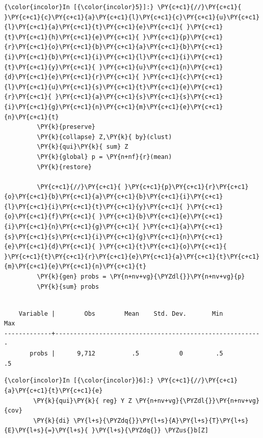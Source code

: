 \documentclass[11pt,notitlepage]{article}\usepackage[]{graphicx}\usepackage[]{color}
\makeatletter
\newenvironment{kframe}{%
 \def\at@end@of@kframe{}%
 \ifinner\ifhmode%
  \def\at@end@of@kframe{\end{minipage}}%
  \begin{minipage}{\columnwidth}%
 \fi\fi%
 \def\FrameCommand##1{\hskip\@totalleftmargin \hskip-\fboxsep
 \colorbox{shadecolor}{##1}\hskip-\fboxsep
     \hskip-\linewidth \hskip-\@totalleftmargin \hskip\columnwidth}%
 \MakeFramed {\advance\hsize-\width
   \@totalleftmargin\z@ \linewidth\hsize
   \@setminipage}}%
 {\par\unskip\endMakeFramed%
 \at@end@of@kframe}
\newenvironment{knitrout}{}{} %
\makeatother
\begin{document}
\begin{enumerate}[a)]
\begin{knitrout}
\color{fgcolor}\begin{kframe}
   \begin{Verbatim}[commandchars=\\\{\}]
{\color{incolor}In [{\color{incolor}5}]:} \PY{c+c1}{//}\PY{c+c1}{ }\PY{c+c1}{c}\PY{c+c1}{a}\PY{c+c1}{l}\PY{c+c1}{c}\PY{c+c1}{u}\PY{c+c1}{l}\PY{c+c1}{a}\PY{c+c1}{t}\PY{c+c1}{e}\PY{c+c1}{ }\PY{c+c1}{t}\PY{c+c1}{h}\PY{c+c1}{e}\PY{c+c1}{ }\PY{c+c1}{p}\PY{c+c1}{r}\PY{c+c1}{o}\PY{c+c1}{b}\PY{c+c1}{a}\PY{c+c1}{b}\PY{c+c1}{i}\PY{c+c1}{b}\PY{c+c1}{i}\PY{c+c1}{l}\PY{c+c1}{i}\PY{c+c1}{t}\PY{c+c1}{y}\PY{c+c1}{ }\PY{c+c1}{u}\PY{c+c1}{n}\PY{c+c1}{d}\PY{c+c1}{e}\PY{c+c1}{r}\PY{c+c1}{ }\PY{c+c1}{c}\PY{c+c1}{l}\PY{c+c1}{u}\PY{c+c1}{s}\PY{c+c1}{t}\PY{c+c1}{e}\PY{c+c1}{r}\PY{c+c1}{ }\PY{c+c1}{a}\PY{c+c1}{s}\PY{c+c1}{s}\PY{c+c1}{i}\PY{c+c1}{g}\PY{c+c1}{n}\PY{c+c1}{m}\PY{c+c1}{e}\PY{c+c1}{n}\PY{c+c1}{t}
         \PY{k}{preserve}
         \PY{k}{collapse} Z,\PY{k}{ by}(clust)   
         \PY{k}{qui}\PY{k}{ sum} Z
         \PY{k}{global} p = \PY{n+nf}{r}(mean)
         \PY{k}{restore}
         
         \PY{c+c1}{//}\PY{c+c1}{ }\PY{c+c1}{p}\PY{c+c1}{r}\PY{c+c1}{o}\PY{c+c1}{b}\PY{c+c1}{a}\PY{c+c1}{b}\PY{c+c1}{i}\PY{c+c1}{l}\PY{c+c1}{i}\PY{c+c1}{t}\PY{c+c1}{y}\PY{c+c1}{ }\PY{c+c1}{o}\PY{c+c1}{f}\PY{c+c1}{ }\PY{c+c1}{b}\PY{c+c1}{e}\PY{c+c1}{i}\PY{c+c1}{n}\PY{c+c1}{g}\PY{c+c1}{ }\PY{c+c1}{a}\PY{c+c1}{s}\PY{c+c1}{s}\PY{c+c1}{i}\PY{c+c1}{g}\PY{c+c1}{n}\PY{c+c1}{e}\PY{c+c1}{d}\PY{c+c1}{ }\PY{c+c1}{t}\PY{c+c1}{o}\PY{c+c1}{ }\PY{c+c1}{t}\PY{c+c1}{r}\PY{c+c1}{e}\PY{c+c1}{a}\PY{c+c1}{t}\PY{c+c1}{m}\PY{c+c1}{e}\PY{c+c1}{n}\PY{c+c1}{t}
         \PY{k}{gen} probs = \PY{n+nv+vg}{\PYZdl{}}\PY{n+nv+vg}{p}
         \PY{k}{sum} probs
\end{Verbatim}

    \begin{Verbatim}[commandchars=\\\{\}]

    Variable |        Obs        Mean    Std. Dev.       Min        Max
-------------+---------------------------------------------------------
       probs |      9,712          .5           0         .5         .5

    \end{Verbatim}

    \begin{Verbatim}[commandchars=\\\{\}]
{\color{incolor}In [{\color{incolor}}6]:} \PY{c+c1}{//}\PY{c+c1}{a}\PY{c+c1}{t}\PY{c+c1}{e}
        \PY{k}{qui}\PY{k}{ reg} Y Z \PY{n+nv+vg}{\PYZdl{}}\PY{n+nv+vg}{cov}
        \PY{k}{di} \PY{l+s}{\PYZdq{}}\PY{l+s}{A}\PY{l+s}{T}\PY{l+s}{E}\PY{l+s}{=}\PY{l+s}{ }\PY{l+s}{\PYZdq{}} \PYZus{}b[Z]
\end{Verbatim}


\end{kframe}
\end{knitrout}
\end{enumerate}
\end{document}

